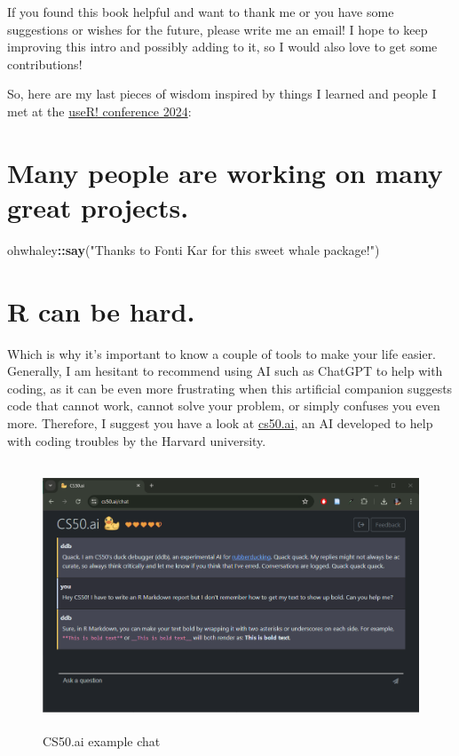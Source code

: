 \documentclass[
]{book}
\newenvironment{Shaded}{\begin{snugshade}}{\end{snugshade}}
\newcommand{\FunctionTok}[1]{\textcolor[rgb]{0.13,0.29,0.53}{\textbf{#1}}}
\newcommand{\NormalTok}[1]{#1}
\newcommand{\SpecialCharTok}[1]{\textcolor[rgb]{0.81,0.36,0.00}{\textbf{#1}}}
\newcommand{\StringTok}[1]{\textcolor[rgb]{0.31,0.60,0.02}{#1}}
\begin{document}
If you found this book helpful and want to thank me or you have some suggestions or wishes for the future, please write me an email!
I hope to keep improving this intro and possibly adding to it, so I would also love to get some contributions!

So, here are my last pieces of wisdom inspired by things I learned and people I met at the \href{https://events.linuxfoundation.org/user/}{useR! conference 2024}:

\section*{Many people are working on many great projects.}\label{many-people-are-working-on-many-great-projects.}

\begin{Shaded}
\begin{Highlighting}[]
\NormalTok{ohwhaley}\SpecialCharTok{::}\FunctionTok{say}\NormalTok{(}\StringTok{"Thanks to Fonti Kar for this sweet whale package!"}\NormalTok{)}
\end{Highlighting}
\end{Shaded}

\section*{R can be hard.}\label{r-can-be-hard.}

Which is why it's important to know a couple of tools to make your life easier.
Generally, I am hesitant to recommend using AI such as ChatGPT to help with coding, as it can be even more frustrating when this artificial companion suggests code that cannot work, cannot solve your problem, or simply confuses you even more.
Therefore, I suggest you have a look at \url{cs50.ai}, an AI developed to help with coding troubles by the Harvard university.

\begin{figure}
\centering
\includegraphics[width=\textwidth,height=3.125in]{./img/cs50ai.png}
\caption{CS50.ai example chat}
\end{figure}
\end{document}
